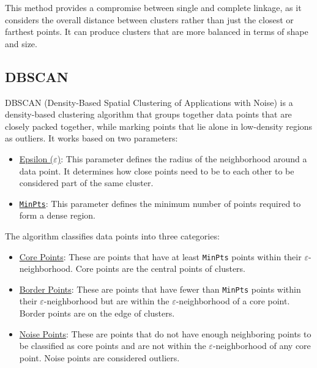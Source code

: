 This method provides a compromise between single and complete linkage, as it considers the overall distance between clusters rather than just the closest or farthest points. It can produce clusters that are more balanced in terms of shape and size.

\subsection{DBSCAN}

DBSCAN (Density-Based Spatial Clustering of Applications with Noise) is a density-based clustering algorithm that groups together data points that are closely packed together, while marking points that lie alone in low-density regions as outliers. It works based on two parameters:
\begin{itemize}
    \item \ul{Epsilon ($\varepsilon$)}: This parameter defines the radius of the neighborhood around a data point. It determines how close points need to be to each other to be considered part of the same cluster.
    \item \ul{\texttt{MinPts}}: This parameter defines the minimum number of points required to form a dense region.
\end{itemize}

The algorithm classifies data points into three categories:
\begin{itemize}
    \item \ul{Core Points}: These are points that have at least \texttt{MinPts} points within their $\varepsilon$-neighborhood. Core points are the central points of clusters.
    \item \ul{Border Points}: These are points that have fewer than \texttt{MinPts} points within their $\varepsilon$-neighborhood but are within the $\varepsilon$-neighborhood of a core point. Border points are on the edge of clusters.
    \item \ul{Noise Points}: These are points that do not have enough neighboring points to be classified as core points and are not within the $\varepsilon$-neighborhood of any core point. Noise points are considered outliers.
\end{itemize}

